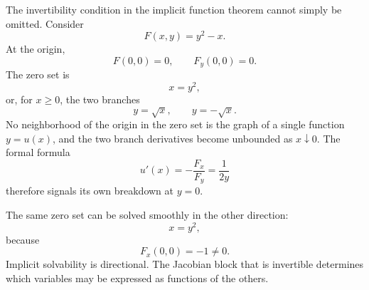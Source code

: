 The invertibility condition in the implicit function theorem cannot simply be omitted.  Consider
\[
  F(x,y)=y^2-x.
\]
At the origin,
\[
  F(0,0)=0,
  \qquad
  F_y(0,0)=0.
\]
The zero set is
\[
  x=y^2,
\]
or, for \(x\ge0\), the two branches
\[
  y=\sqrt{x},
  \qquad
  y=-\sqrt{x}.
\]
No neighborhood of the origin in the zero set is the graph of a single function \(y=u(x)\), and the two branch derivatives become unbounded as \(x\downarrow0\).  The formal formula
\[
  u'(x)=-\frac{F_x}{F_y}=\frac1{2y}
\]
therefore signals its own breakdown at \(y=0\).

The same zero set can be solved smoothly in the other direction:
\[
  x=y^2,
\]
because
\[
  F_x(0,0)=-1\ne0.
\]
Implicit solvability is directional.  The Jacobian block that is invertible determines which variables may be expressed as functions of the others.
